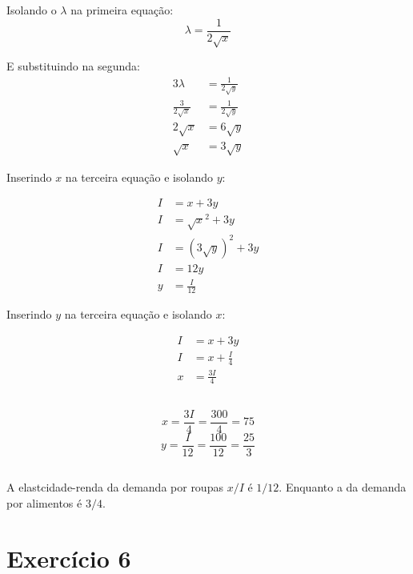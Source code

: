\documentclass{article}
\begin{document}
Isolando o \(\lambda\) na primeira equação:
\[
	\lambda = \frac{1}{2\sqrt{x}}
\]

E substituindo na segunda:
\[
	\begin{aligned}
		3\lambda            & = \frac{1}{2\sqrt{y}} \\
		\frac{3}{2\sqrt{x}} & = \frac{1}{2\sqrt{y}} \\
		2\sqrt{x}           & = 6\sqrt{y}           \\
		\sqrt{x}            & = 3\sqrt{y}
	\end{aligned}
\]

Inserindo \(x\) na terceira equação e isolando \(y\):

\[
	\begin{aligned}
		I & = x +3y              \\
		I & = \sqrt{x}^2 +3y     \\
		I & = (3\sqrt{y})^2 + 3y \\
		I & = 12y                \\
		y & = \frac{I}{12}
	\end{aligned}
\]

Inserindo \(y\) na terceira equação e isolando \(x\):

\[
	\begin{aligned}
		I & = x + 3y         \\
		I & = x +\frac{I}{4} \\
		x & = \frac{3I}{4}
	\end{aligned}
\]

\subsection{}

\[ x = \frac{3I}{4} = \frac{300}{4} = 75 \]
\[ y = \frac{I}{12} = \frac{100}{12} = \frac{25}{3} \]

\subsection{}

A elastcidade-renda da demanda por roupas \(x/I\) é \(1/12\). Enquanto a da
demanda por alimentos é \(3/4\).

\section{Exercício 6}
\end{document}
